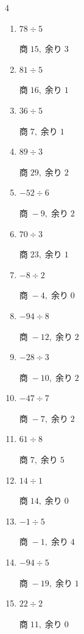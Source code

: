 \begin{multicols}{4}
\begin{enumerate}
  \item $78 \div 5$

        $商\; 15,\; 余り\; 3$

\columnbreak %

  \item $81 \div 5$

        $商\; 16,\; 余り\; 1$

  \item $36 \div 5$

        $商\; 7,\; 余り\; 1$

  \item $89 \div 3$

        $商\; 29,\; 余り\; 2$

  \item $-52 \div 6$

        $商\; -9,\; 余り\; 2$

  \item $70 \div 3$

        $商\; 23,\; 余り\; 1$

  \item $-8 \div 2$

        $商\; -4,\; 余り\; 0$

  \item $-94 \div 8$

        $商\; -12,\; 余り\; 2$

  \item $-28 \div 3$

        $商\; -10,\; 余り\; 2$

  \item $-47 \div 7$

        $商\; -7,\; 余り\; 2$

  \item $61 \div 8$

        $商\; 7,\; 余り\; 5$

  \item $14 \div 1$

        $商\; 14,\; 余り\; 0$

  \item $-1 \div 5$

        $商\; -1,\; 余り\; 4$

  \item $-94 \div 5$

        $商\; -19,\; 余り\; 1$

  \item $22 \div 2$

        $商\; 11,\; 余り\; 0$


\end{enumerate}
\end{multicols}
